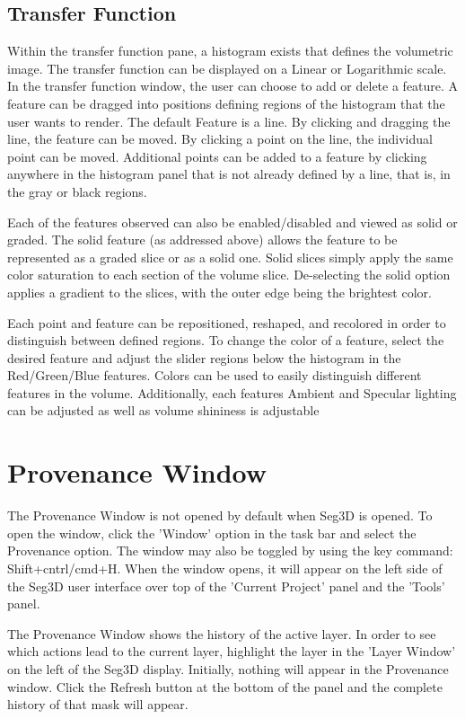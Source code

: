 \documentclass[fleqn,11pt,openany]{book}
\begin{document}
\subsection{Transfer Function}
Within the transfer function pane, a histogram exists that defines the volumetric image.
The transfer function can be displayed on a Linear or Logarithmic scale.
In the transfer function window, the user can choose to add or delete a feature.
A feature can be dragged into positions defining regions of the histogram that the user wants to render.
The default Feature is a line.  
By clicking and dragging the line, the feature can be moved.
By clicking a point on the line, the individual point can be moved.
Additional points can be added to a feature by clicking anywhere in the histogram panel  that is not already defined by a line, that is, in the gray or black regions.

Each of the features observed can also be enabled/disabled and viewed as solid or graded.
The solid feature (as addressed above) allows the feature to be represented as a graded slice or as a solid one.
Solid slices simply apply the same color saturation to each section of the volume slice.
De-selecting the solid option applies a gradient to the slices, with the outer edge being the brightest color.

Each point and feature can be repositioned, reshaped, and recolored in order to distinguish between defined regions.
To change the color of a feature, select the desired feature and adjust the slider regions below the histogram in the Red/Green/Blue features.
Colors can be used to easily distinguish different features in the volume.
Additionally, each features Ambient and Specular lighting can be adjusted as well as volume shininess is adjustable



\section{Provenance Window}
The Provenance Window is not opened by default when Seg3D is opened. 
To open the window, click the 'Window' option in the task bar and select the Provenance option.  
The window may also be toggled by using the key command: Shift+cntrl/cmd+H.
When the window opens, it will appear on the left side of the Seg3D user interface over top of the 'Current Project' panel and the 'Tools' panel.

The Provenance Window shows the history of the active layer.  
In order to see which actions lead to the current layer, highlight the layer in the 'Layer Window' on the left of the Seg3D display.
Initially, nothing will appear in the Provenance window.
Click the Refresh button at the bottom of the panel and the complete history of that mask will appear.
\end{document}
